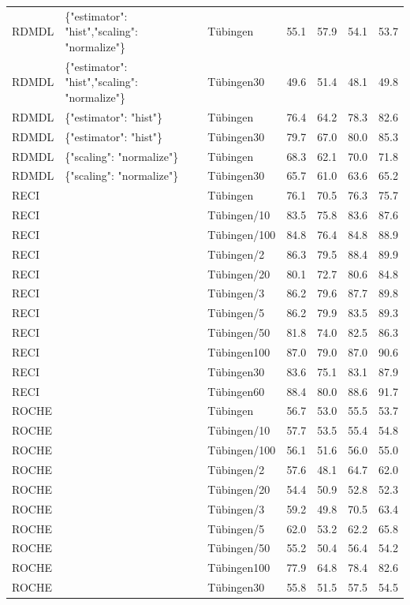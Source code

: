 \begin{tabular}{lllllll}
RDMDL & \{"estimator": "hist","scaling": "normalize"\} & Tübingen & 55.1 & 57.9 & 54.1 & 53.7 \\
RDMDL & \{"estimator": "hist","scaling": "normalize"\} & Tübingen30 & 49.6 & 51.4 & 48.1 & 49.8 \\
RDMDL & \{"estimator": "hist"\} & Tübingen & 76.4 & 64.2 & 78.3 & 82.6 \\
RDMDL & \{"estimator": "hist"\} & Tübingen30 & 79.7 & 67.0 & 80.0 & 85.3 \\
RDMDL & \{"scaling": "normalize"\} & Tübingen & 68.3 & 62.1 & 70.0 & 71.8 \\
RDMDL & \{"scaling": "normalize"\} & Tübingen30 & 65.7 & 61.0 & 63.6 & 65.2 \\
RECI &  & Tübingen & 76.1 & 70.5 & 76.3 & 75.7 \\
RECI &  & Tübingen/10 & 83.5 & 75.8 & 83.6 & 87.6 \\
RECI &  & Tübingen/100 & 84.8 & 76.4 & 84.8 & 88.9 \\
RECI &  & Tübingen/2 & 86.3 & 79.5 & 88.4 & 89.9 \\
RECI &  & Tübingen/20 & 80.1 & 72.7 & 80.6 & 84.8 \\
RECI &  & Tübingen/3 & 86.2 & 79.6 & 87.7 & 89.8 \\
RECI &  & Tübingen/5 & 86.2 & 79.9 & 83.5 & 89.3 \\
RECI &  & Tübingen/50 & 81.8 & 74.0 & 82.5 & 86.3 \\
RECI &  & Tübingen100 & 87.0 & 79.0 & 87.0 & 90.6 \\
RECI &  & Tübingen30 & 83.6 & 75.1 & 83.1 & 87.9 \\
RECI &  & Tübingen60 & 88.4 & 80.0 & 88.6 & 91.7 \\
ROCHE &  & Tübingen & 56.7 & 53.0 & 55.5 & 53.7 \\
ROCHE &  & Tübingen/10 & 57.7 & 53.5 & 55.4 & 54.8 \\
ROCHE &  & Tübingen/100 & 56.1 & 51.6 & 56.0 & 55.0 \\
ROCHE &  & Tübingen/2 & 57.6 & 48.1 & 64.7 & 62.0 \\
ROCHE &  & Tübingen/20 & 54.4 & 50.9 & 52.8 & 52.3 \\
ROCHE &  & Tübingen/3 & 59.2 & 49.8 & 70.5 & 63.4 \\
ROCHE &  & Tübingen/5 & 62.0 & 53.2 & 62.2 & 65.8 \\
ROCHE &  & Tübingen/50 & 55.2 & 50.4 & 56.4 & 54.2 \\
ROCHE &  & Tübingen100 & 77.9 & 64.8 & 78.4 & 82.6 \\
ROCHE &  & Tübingen30 & 55.8 & 51.5 & 57.5 & 54.5 \\

\end{tabular}
